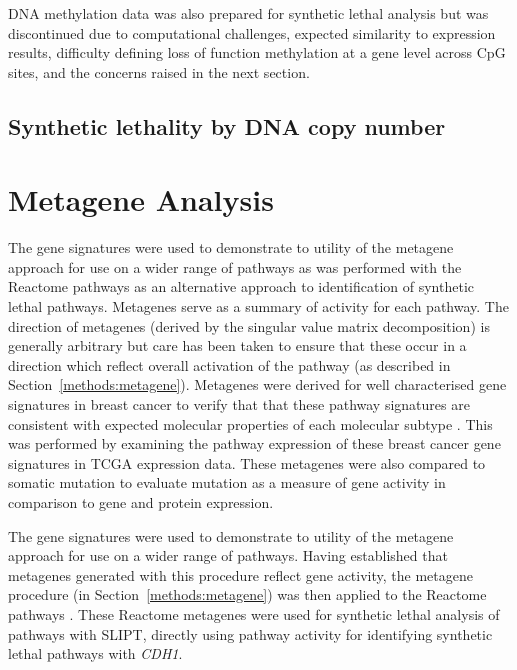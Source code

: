 DNA methylation data was also prepared for synthetic lethal analysis but was discontinued due to computational challenges, expected similarity to expression results, difficulty defining loss of function methylation at a gene level across CpG sites, and the concerns raised in the next section. 

\subsection{Synthetic lethality by DNA copy number}


\fi


\section{Metagene Analysis}  \label{chapt3:metagene_results}

The gene signatures \citep{Gatza2011, Gatza2014} were used to demonstrate to utility of the metagene approach for use on a wider range of pathways as was performed with the Reactome \citep{Reactome} pathways as an alternative approach to identification of synthetic lethal pathways. Metagenes serve as a summary of activity for each pathway. The direction of metagenes (derived by the singular value matrix decomposition) is generally arbitrary but care has been taken to ensure that these occur in a direction which reflect overall activation of the pathway (as described in Section~\ref{methods:metagene}). Metagenes were derived for well characterised gene signatures in breast cancer \citep{Gatza2011, Gatza2014} to verify that that these pathway signatures are consistent with expected molecular properties of each molecular subtype \citep{Perou2000, Parker2009}. This was performed by examining the pathway expression of these breast cancer gene signatures in TCGA expression data. These metagenes were also compared to somatic mutation to evaluate mutation as a measure of gene activity in comparison to gene and protein expression.

The gene signatures \citep{Gatza2011, Gatza2014} were used to demonstrate to utility of the metagene approach for use on a wider range of pathways. Having established that metagenes generated with this procedure reflect gene activity, the metagene procedure (in Section~\ref{methods:metagene}) was then applied to the Reactome pathways \citep{Reactome}. These Reactome metagenes were used for synthetic lethal analysis of pathways with \gls{SLIPT}, directly using pathway activity for identifying synthetic lethal pathways with \textit{CDH1}.


